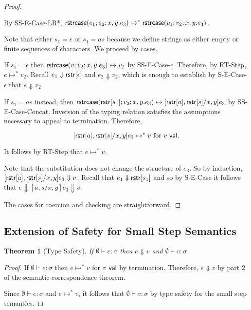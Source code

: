 \documentclass[12pt]{article}
\newcommand{\todo}[1]{{\color{red} #1}}
\newtheorem{thm}{Theorem}
\theoremstyle{definition}
\newcommand{\sistr}[1]{{\sf rstr}[#1]}   \newcommand{\rstr}[1]{{\sf rstr}[#1]} %
\newcommand{\val}{{\sf val}}
\newcommand{\strin}[1]{\sistr{#1}}
\newcommand{\strcase}[3]{ {\sf rstrcase}(#1; #2; #3)}
\newcommand{\sreduces}{ \Downarrow }
\begin{document}
\begin{proof}
\begin{itemize}[label=$ $,itemsep=1ex]
By SS-E-Case-LR*, $\strcase{e_1}{e_2}{x,y.e_3} \mapsto^* \strcase{v_1}{v_2}{x,y.e_3}$.

Note that either $s_1 = \epsilon$ or $s_1 = as$ because we define strings as either empty or finite sequences of characters.
We proceed by cases.

If $s_1 = \epsilon$ then $\strcase{v}{v_2}{x,y.e_3} \mapsto v_2$ by SS-E-Case-$\epsilon$.
Therefore, by RT-Step, $e \mapsto^* v_2$.
Recall $e_1 \sreduces \strin{\epsilon}$ and $e_2 \sreduces v_2$, which is enough to establish by S-E-Case-$\epsilon$ that $e \sreduces v_2$.

If $s_1 = as$ instead, then $\strcase{\strin{s_1}}{v_2}{x,y.e_3} \mapsto [\strin{a},\strin{s} / x,y ] e_3$ by SS-E-Case-Concat.
Inversion of the typing relation satisfies the assumptions necessary to appeal to termination.
Therefore,

\[ [\strin{a},\strin{s} / x,y ] e_3 \mapsto^* v \text{ for } v \ \val. \]

It follows by RT-Step that $e \mapsto^* v$.

Note that the substitution does not change the structure of $e_3$.
So by induction, $[\strin{a},\strin{s} / x,y ] e_3 \sreduces v$.
Recall that $e_1 \sreduces \strin{s_1}$ and so by S-E-Case it follows that $e \sreduces [a,s / x,y] e_3 \sreduces v$.
\end{itemize}

\todo{The cases for coercion and checking are straightforward.}
\end{proof}


\subsection{Extension of Safety for Small Step Semantics}

\begin{thm}[Type Safety] \label{thm:typesafety}
  If $\emptyset \vdash e : \sigma$ 
  then $e \sreduces v$ and $\emptyset \vdash v : \sigma$.
\end{thm}
\begin{proof}
If $\emptyset \vdash e : \sigma$ then $e \mapsto^* v$ for $v \ \val$ by termination.
Therefore, $e \sreduces v$ by part 2 of the semantic correspondence theorem.

Since $\emptyset \vdash e : \sigma$ and $e \mapsto^* v$, it follows that $\emptyset \vdash v : \sigma$ by type safety for the small step semantics.
\end{proof}
\end{document}
